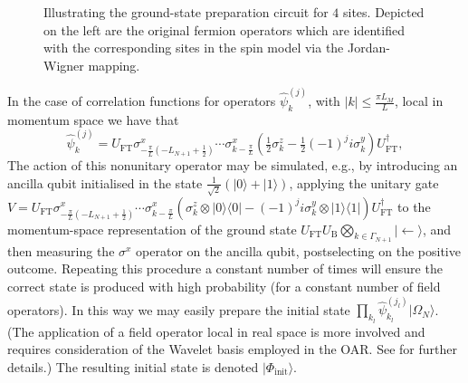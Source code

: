 \documentclass[12pt]{article}
\newcommand{\1}{\mathds{1}}
\begin{document}
\begin{figure}
\begin{center}
	\caption{Illustrating the ground-state preparation circuit for $4$ sites. Depicted on the left are the original fermion operators which are identified with the corresponding sites in the spin model via the Jordan-Wigner mapping.}\label{fig:fft}
	\end{center}
\end{figure}
In the case of correlation functions for operators $\widehat{\psi}_k^{(j)}$, with $|k|\le \frac{\pi L_{M}}{L}$, local in momentum space we have that
\begin{equation}
	\widehat{\psi}_k^{(j)} = U_{\text{FT}}\sigma^x_{-\frac{\pi}{L}(-L_{N+1}+\frac12)}\cdots \sigma^x_{k-\frac{\pi}{L}}(\tfrac{1}{2}\sigma_{k}^z-\tfrac{1}{2}(-1)^ji\sigma_{k}^y)U_{\text{FT}}^\dag,
\end{equation}
The action of this nonunitary operator may be simulated, e.g., by introducing an ancilla qubit initialised in the state $\frac{1}{\sqrt{2}}(|0\rangle+|1\rangle\!)$, applying the unitary gate $V\!=\!U_{\text{FT}}\sigma^x_{-\frac{\pi}{L}(-L_{N+1}+\frac12)}\!\cdots \sigma^x_{k-\frac{\pi}{L}}(\sigma_{k}^z\otimes |0\rangle\langle
0|-(-1)^ji\sigma_{k}^y\otimes |1\rangle\langle
1|)U_{\text{FT}}^\dag$ to the momentum-space representation of the ground state $U_{\text{FT}}U_{\text{B}}\bigotimes_{k\in \Gamma_{N+1}} |\!\!\leftarrow\rangle$, and then measuring the $\sigma^x$ operator on the ancilla qubit, postselecting on the positive outcome. Repeating this procedure a constant number of times will ensure the correct state is produced with high probability (for a constant number of field operators). In this way we may easily prepare
the initial state $\prod_{k_l}\widehat{\psi}_{k_l}^{(j_l)}|\Omega_N\rangle$. (The application of a field operator local in real space is more involved and requires consideration of the Wavelet basis employed in the OAR. See \cite{osborneConformal2021} for further details.) The resulting initial state is denoted $|\Phi_{\text{init}}\rangle$.
\end{document}
